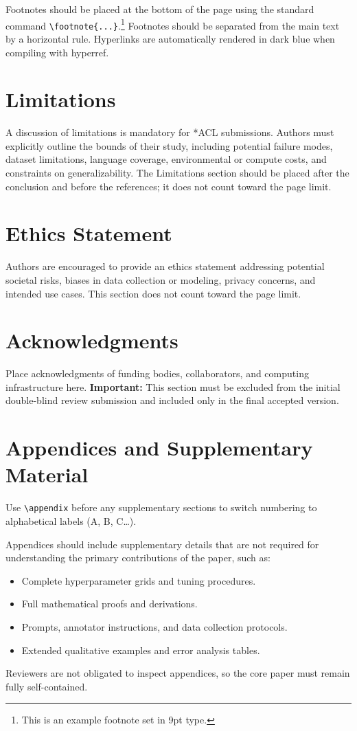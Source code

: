 \documentclass[11pt]{article}
\begin{document}
Footnotes should be placed at the bottom of the page using the standard command \verb|\footnote{...}|.\footnote{This is an example footnote set in 9pt type.} Footnotes should be separated from the main text by a horizontal rule. Hyperlinks are automatically rendered in dark blue when compiling with hyperref.

\section*{Limitations}
A discussion of limitations is mandatory for *ACL submissions. Authors must explicitly outline the bounds of their study, including potential failure modes, dataset limitations, language coverage, environmental or compute costs, and constraints on generalizability. The Limitations section should be placed after the conclusion and before the references; it does not count toward the page limit.

\section*{Ethics Statement}
Authors are encouraged to provide an ethics statement addressing potential societal risks, biases in data collection or modeling, privacy concerns, and intended use cases. This section does not count toward the page limit.

\section*{Acknowledgments}
Place acknowledgments of funding bodies, collaborators, and computing infrastructure here. \textbf{Important:} This section must be excluded from the initial double-blind review submission and included only in the final accepted version.



\appendix

\section{Appendices and Supplementary Material}
\label{sec:appendix}

Use \verb|\appendix| before any supplementary sections to switch numbering to alphabetical labels (A, B, C\dots).

Appendices should include supplementary details that are not required for understanding the primary contributions of the paper, such as:
\begin{itemize}
    \item Complete hyperparameter grids and tuning procedures.
    \item Full mathematical proofs and derivations.
    \item Prompts, annotator instructions, and data collection protocols.
    \item Extended qualitative examples and error analysis tables.
\end{itemize}
Reviewers are not obligated to inspect appendices, so the core paper must remain fully self-contained.
\end{document}

